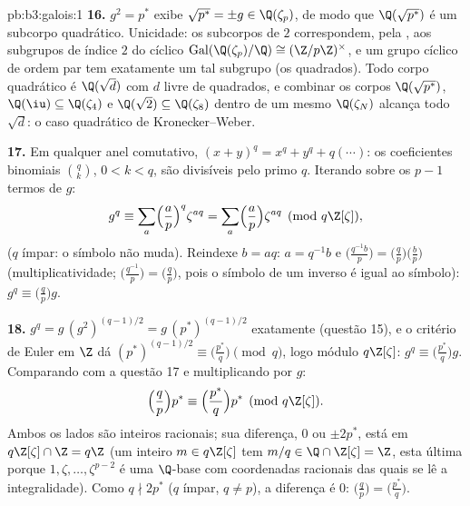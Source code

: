 \begin{solution}{pb:b3:galois:1}
\textbf{16.} $g^2 = p^*$ exibe $\sqrt{p^*} = \pm g \in
\Q(\zeta_p)$, de modo que $\Q(\sqrt{p^*})$ é um subcorpo quadrático.
Unicidade: os subcorpos de  $2$ correspondem, pela
, aos subgrupos de índice $2$ do cíclico
$\operatorname{Gal}(\Q(\zeta_p)/\Q) \cong (\Z/p\Z)^\times$,
e um grupo cíclico de ordem par tem exatamente um tal
subgrupo (os quadrados). Todo corpo quadrático é
$\Q(\sqrt{d})$ com $d$ livre de quadrados, e combinar os corpos
$\Q(\sqrt{p^*})$, $\Q(\iu) \subseteq \Q(\zeta_4)$ e
$\Q(\sqrt2) \subseteq \Q(\zeta_8)$ dentro de um mesmo
$\Q(\zeta_N)$ alcança todo $\sqrt d$: o caso quadrático de
Kronecker--Weber.

\textbf{17.} Em qualquer anel comutativo, $(x + y)^q = x^q + y^q
+ q(\cdots)$: os coeficientes binomiais $\binom qk$, $0 < k <
q$, são divisíveis pelo primo $q$. Iterando sobre os $p - 1$
termos de $g$:
\[
g^q \equiv \sum_{a}\Bigl(\frac ap\Bigr)^{q}\zeta^{aq}
= \sum_a\Bigl(\frac ap\Bigr)\zeta^{aq}
\pmod{q\Z[\zeta]},
\]
($q$ ímpar: o símbolo não muda). Reindexe $b = aq$: $a =
q^{-1}b$ e $\bigl(\frac{q^{-1}b}p\bigr) =
\bigl(\frac{q}p\bigr)\bigl(\frac bp\bigr)$ (multiplicatividade;
$\bigl(\frac{q^{-1}}p\bigr) = \bigl(\frac qp\bigr)$, pois o
símbolo de um inverso é igual ao símbolo): $g^q \equiv
\bigl(\frac qp\bigr)g$.

\textbf{18.} $g^q = g\,(g^2)^{(q-1)/2} = g\,(p^*)^{(q-1)/2}$
exatamente (questão 15), e o critério de Euler em $\Z$ dá
$(p^*)^{(q-1)/2} \equiv \bigl(\frac{p^*}q\bigr) \pmod q$,
logo módulo $q\Z[\zeta]$: $g^q \equiv \bigl(\frac{p^*}q\bigr)g$.
Comparando com a questão 17 e multiplicando por $g$:
\[
\Bigl(\frac qp\Bigr)p^* \equiv \Bigl(\frac{p^*}q\Bigr)p^*
\pmod{q\Z[\zeta]} .
\]
Ambos os lados são inteiros racionais; sua diferença, $0$ ou
$\pm2p^*$, está em $q\Z[\zeta] \cap \Z = q\Z$ (um inteiro $m
\in q\Z[\zeta]$ tem $m/q \in \Q \cap \Z[\zeta] = \Z$, esta última porque $1, \zeta, \dots, \zeta^{p-2}$ é uma
$\Q$-base com coordenadas racionais das quais se lê a
integralidade). Como $q \nmid 2p^*$ ($q$ ímpar, $q \neq p$),
a diferença é $0$: $\bigl(\frac qp\bigr) =
\bigl(\frac{p^*}q\bigr)$.


\end{solution}

